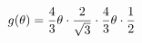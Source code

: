 \documentclass[preview]{standalone}
\begin{document}
\begin{align*}
g( \theta ) = {4 \over 3} \theta \cdot {2 \over \sqrt{3}} \cdot {4 \over 3} \theta \cdot {1 \over 2}
\end{align*}
\end{document}
